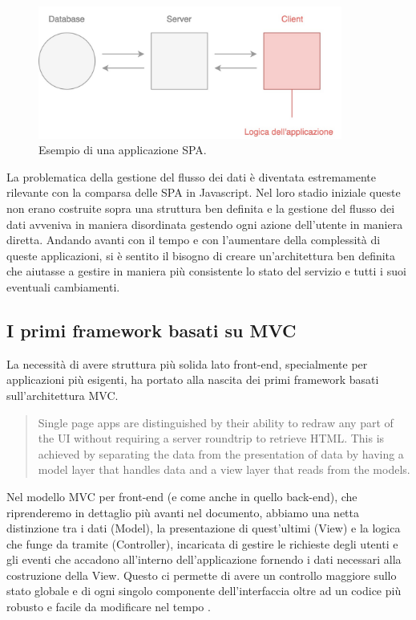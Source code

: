 \begin{figure}[h]
\centering
\includegraphics[width=10cm]{./images/yesSPA} 
\caption{Esempio di una applicazione SPA.}
\end{figure}

\noindent
La problematica della gestione del flusso dei dati è diventata estremamente rilevante con la comparsa delle SPA in Javascript. Nel loro stadio iniziale queste non erano costruite sopra una struttura ben definita e la gestione del flusso dei dati avveniva in maniera disordinata gestendo ogni azione dell'utente in maniera diretta.
Andando avanti con il tempo e con l'aumentare della complessità di queste applicazioni, si è sentito il bisogno di creare un'architettura ben definita che aiutasse a gestire in maniera più consistente lo stato del servizio e tutti i suoi eventuali cambiamenti.

\subsection{I primi framework basati su MVC}
La necessità di avere struttura più solida lato front-end, specialmente per applicazioni più esigenti, ha portato alla nascita dei primi framework basati sull'architettura MVC.

\blockquote{Single page apps are distinguished by their ability to redraw any part of the UI without requiring a server roundtrip to retrieve HTML. This is achieved by separating the data from the presentation of data by having a model layer that handles data and a view layer that reads from the models. \cite{MixuSinglePageWebApp}}

\noindent Nel modello MVC per front-end (e come anche in quello back-end), che riprenderemo in dettaglio più avanti nel documento, abbiamo una netta distinzione tra i dati (Model), la presentazione di quest'ultimi (View) e la logica che funge da tramite (Controller), incaricata di gestire le richieste degli utenti e gli eventi che accadono all'interno dell'applicazione fornendo i dati necessari alla costruzione della View. Questo ci permette di avere un controllo maggiore sullo stato globale e di ogni singolo componente dell'interfaccia oltre ad un codice più robusto e facile da modificare nel tempo \cite{ParrOnTheMVC}.

